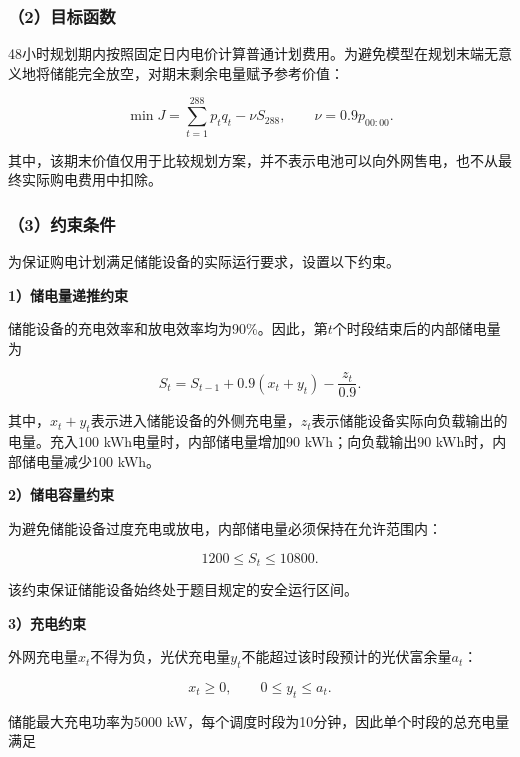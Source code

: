 \subsubsection*{（2）目标函数}

48小时规划期内按照固定日内电价计算普通计划费用。为避免模型在规划末端无意义地将储能完全放空，对期末剩余电量赋予参考价值：

\begin{equation}
\min J
=
\sum_{t=1}^{288}p_tq_t
-
\nu S_{288},
\qquad
\nu=0.9p_{00:00}.
\label{eq:q2_objective}
\end{equation}

其中，该期末价值仅用于比较规划方案，并不表示电池可以向外网售电，也不从最终实际购电费用中扣除。


\subsubsection*{（3）约束条件}

为保证购电计划满足储能设备的实际运行要求，设置以下约束。

\textbf{1）储电量递推约束}

储能设备的充电效率和放电效率均为90\%。因此，第$t$个时段结束后的内部储电量为

\begin{equation}
S_t
=
S_{t-1}
+
0.9(x_t+y_t)
-
\frac{z_t}{0.9}.
\label{eq:q2_soc}
\end{equation}

其中，$x_t+y_t$表示进入储能设备的外侧充电量，$z_t$表示储能设备实际向负载输出的电量。充入100 kWh电量时，内部储电量增加90 kWh；向负载输出90 kWh时，内部储电量减少100 kWh。


\textbf{2）储电容量约束}

为避免储能设备过度充电或放电，内部储电量必须保持在允许范围内：

\begin{equation}
1200
\leq
S_t
\leq
10800.
\label{eq:q2_soc_bound}
\end{equation}

该约束保证储能设备始终处于题目规定的安全运行区间。


\textbf{3）充电约束}

外网充电量$x_t$不得为负，光伏充电量$y_t$不能超过该时段预计的光伏富余量$a_t$：

\begin{equation}
x_t\geq0,
\qquad
0\leq y_t\leq a_t.
\label{eq:q2_charge_source}
\end{equation}

储能最大充电功率为5000 kW，每个调度时段为10分钟，因此单个时段的总充电量满足

